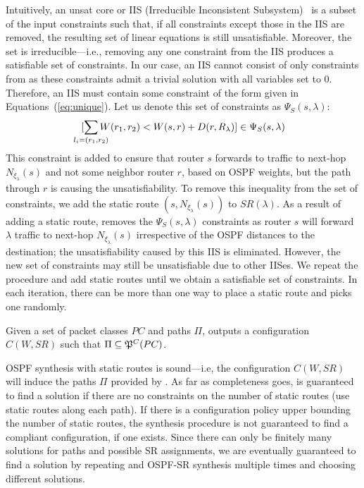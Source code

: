 Intuitively, an unsat core or IIS (Irreducible Inconsistent Subsystem)~\cite{chinneck2007feasibility} 
is a subset of the input constraints such that,
if all constraints except those in the IIS are removed, the resulting set of
linear equations is still unsatisfiable. 
Moreover, the set is irreducible---i.e., removing 
any one constraint from the IIS produces a satisfiable set of constraints. 
In our case, an IIS cannot consist of only 
constraints from  as these constraints
admit a trivial solution with all variables set to 0. 
Therefore, an IIS must contain some constraint of the form
given in Equations~(\ref{eq:unique}). Let us denote 
this set of constraints as $\Psi_S(s, \lambda)$:
\[
[\sum_{\mathclap{\substack{l_i=(r_1,r_2)}}} 
W(r_1, r_2) < W(s, r) + D(r, R_\lambda) ] \in \Psi_S(s, \lambda)
\]	
This constraint is added to ensure 
that router $s$ forwards to traffic to next-hop
$N_{\xi_\lambda}(s)$ and not some neighbor router 
$r$, based on OSPF weights,
but the path through $r$ is causing the unsatisfiability. 
To remove this inequality from the set of constraints, 
we add the static route $(s,N_{\xi_\lambda}(s))$ to $SR(\lambda)$.
As a result of adding a static route, \name removes 
the $\Psi_S(s, \lambda)$ constraints as router $s$ 
will forward $\lambda$ traffic  to 
next-hop $N_{\xi_\lambda}(s)$ irrespective of
the OSPF distances to the destination; the 
unsatisfiability caused by this IIS is eliminated. 
However, the new set of
constraints may still be unsatisfiable due to other IISes.
We repeat the procedure and add static routes
until we obtain a satisfiable set of
constraints. 
In each iteration, there can be more than one way to place a static route and
\name picks one randomly. 

\iffull
\begin{theorem} \label{thm:ospfsr}
	Given a set of packet classes $PC$ and paths $\Pi$,  outputs
	a configuration $C(W,SR)$ such that $\Pi\subseteq\mathfrak{P}^C(PC)$.
\end{theorem}

\fi

OSPF synthesis with static routes 
is sound---i.e, the configuration $C(W,SR)$ 
will induce the paths $\Pi$ provided by \genesis. As far as
completeness goes, \name is guaranteed to find a solution if
there are no constraints on the number of static routes (use
static routes along each path). If there is a configuration policy 
upper bounding the number of static routes, the synthesis procedure 
is not guaranteed 
to find a compliant configuration, if one exists. 
Since there can only be finitely many 
solutions for paths and possible SR assignments, we are eventually guaranteed 
to find a solution by repeating \genesis and
OSPF-SR synthesis multiple times and choosing different
solutions.


